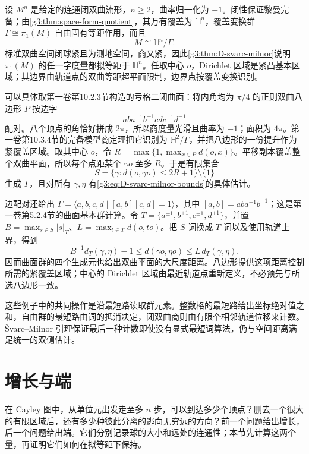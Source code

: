 \begin{example}\label{g3:exm:D-closed-hyperbolic-quotient}
	设 \(M^n\) 是给定的连通闭双曲流形，\(n\ge2\)，曲率归一化为 \(-1\)。闭性保证黎曼完备；由\cref{g3:thm:space-form-quotient}，其万有覆盖为 \(\mathbb H^n\)，覆盖变换群 \(\Gamma\cong\pi_1(M)\) 自由固有等距作用，而且
	\[
		M\cong\mathbb H^n/\Gamma.
	\]
	标准双曲空间闭球紧且为测地空间，商又紧，因此\cref{g3:thm:D-svarc-milnor}说明 \(\pi_1(M)\) 的任一字度量都拟等距于 \(\mathbb H^n\)。任取中心 \(o\)，Dirichlet 区域是紧凸基本区域；其边界由轨道点的双曲等距超平面限制，边界点按覆盖变换识别。

	可以具体取第一卷第10.2.3节构造的亏格二闭曲面：将内角均为 \(\pi/4\) 的正则双曲八边形 \(P\) 按边字
	\[
		aba^{-1}b^{-1}cdc^{-1}d^{-1}
	\]
	配对。八个顶点的角恰好拼成 \(2\pi\)，所以商度量光滑且曲率为 \(-1\)；面积为 \(4\pi\)。第一卷第10.3.4节的完备模型商定理把它识别为 \(\mathbb H^2/\Gamma\)，并把八边形的一份提升作为紧覆盖区域。取其中心 \(o\)，令
	\(R=\max\{1,\max_{x\in P}d(o,x)\}\)。平移副本覆盖整个双曲平面，所以每个点距某个 \(\gamma o\) 至多 \(R\)。于是有限集合
	\[
		S=\{\gamma:d(o,\gamma o)\le2R+1\}\setminus\{1\}
	\]
	生成 \(\Gamma\)，且对所有 \(\gamma,\eta\) 有\eqref{g3:eq:D-svarc-milnor-bounds}的具体估计。

	边配对还给出
	\(\Gamma=\langle a,b,c,d\mid[a,b][c,d]=1\rangle\)，其中
	\([a,b]=aba^{-1}b^{-1}\)；这是第一卷第5.2.4节的曲面基本群计算。令 \(T=\{a^{\pm1},b^{\pm1},c^{\pm1},d^{\pm1}\}\)，并置
	\(B=\max_{s\in S}|s|_T\)、\(L=\max_{t\in T}d(o,to)\)。把 \(S\) 词换成 \(T\) 词以及使用轨道上界，得到
	\[
		B^{-1}d_T(\gamma,\eta)-1
		\le d(\gamma o,\eta o)
		\le L\,d_T(\gamma,\eta).
	\]
	因而曲面群的四个生成元也给出双曲平面的大尺度距离。八边形提供这项距离控制所需的紧覆盖区域；中心的 Dirichlet 区域由最近轨道点重新定义，不必预先与所选八边形一致。
\end{example}

这些例子中的共同操作是沿最短路读取群元素。整数格的最短路给出坐标绝对值之和，自由群的最短路由词的抵消决定，闭双曲商则由有限个相邻轨道位移来计数。Švarc--Milnor 引理保证最后一种计数即使没有显式最短词算法，仍与空间距离满足统一的双侧估计。

\section{增长与端}
\label{g3:sec:D02}

在 Cayley 图中，从单位元出发走至多 \(n\) 步，可以到达多少个顶点？删去一个很大的有限区域后，还有多少种彼此分离的逃向无穷远的方向？前一个问题给出增长，后一个问题给出端。它们分别记录球的大小和远处的连通性；本节先计算这两个量，再证明它们如何在拟等距下保持。

